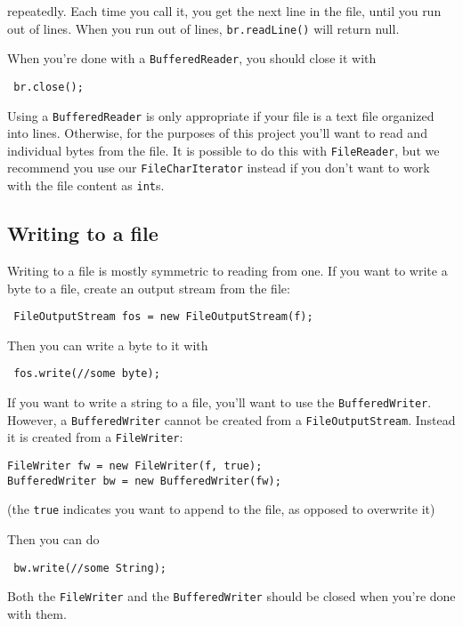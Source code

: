 \documentclass[11pt]{article}
\begin{document}
repeatedly. Each time you call it, you get the next line in the file, until you run out of lines. When you run out of lines, \texttt{br.readLine()} will return null.

When you're done with a \texttt{BufferedReader}, you should close it with
\begin{center}
\texttt{
    br.close();
}
\end{center}

Using a \texttt{BufferedReader} is only appropriate if your file is a text file organized into lines. Otherwise, for the purposes of this project you'll want to read and individual bytes from the file. It is possible to do this with \texttt{FileReader}, but we recommend you use our \texttt{FileCharIterator} instead if you don't want to work with the file content as \texttt{int}s.

\subsection*{Writing to a file}

Writing to a file is mostly symmetric to reading from one. If you want to write a byte to a file, create an output stream from the file:
\begin{center}
\texttt{
    FileOutputStream fos = new FileOutputStream(f);
}
\end{center}

Then you can write a byte to it with
\begin{center}
\texttt{
    fos.write(//some byte);
}
\end{center}

If you want to write a string to a file, you'll want to use the \texttt{BufferedWriter}. However, a \texttt{BufferedWriter} cannot be created from a \texttt{FileOutputStream}. Instead it is created from a \texttt{FileWriter}: 
\begin{verbatim}
FileWriter fw = new FileWriter(f, true);
BufferedWriter bw = new BufferedWriter(fw);
\end{verbatim}
(the \texttt{true} indicates you want to append to the file, as opposed to overwrite it)

Then you can do
\begin{center}
\texttt{
    bw.write(//some String);
}
\end{center}

Both the \texttt{FileWriter} and the \texttt{BufferedWriter} should be closed when you're done with them.

\newpage
\end{document}
